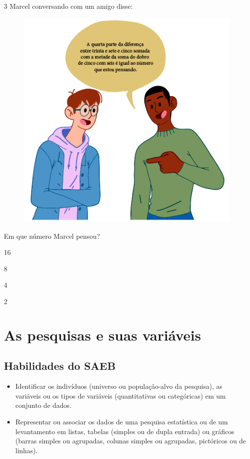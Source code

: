 \pagebreak
\num{3} Marcel conversando com um amigo disse:

\begin{figure}[htpb!]
\centering
\includegraphics[width=.8\textwidth]{../ilustracoes/MAT5/SAEB_5ANO_MAT_figura94.png}
\end{figure}

Em que número Marcel pensou?

\begin{escolha}
\item
  16
\item
  8
\item
  4
\item
  2
\end{escolha}


\chapter{As pesquisas e suas variáveis}

\section*{Habilidades do SAEB}

\begin{itemize}
\item Identificar os indivíduos (universo ou população-alvo da pesquisa),
as variáveis ou os tipos de variáveis (quantitativas ou categóricas) em 
um conjunto de dados.

\item Representar ou associar os dados de uma pesquisa estatística ou
de um levantamento em listas, tabelas (simples ou de dupla entrada) ou
gráficos (barras simples ou agrupadas, colunas simples ou agrupadas,
pictóricos ou de linhas).
\end{itemize}


